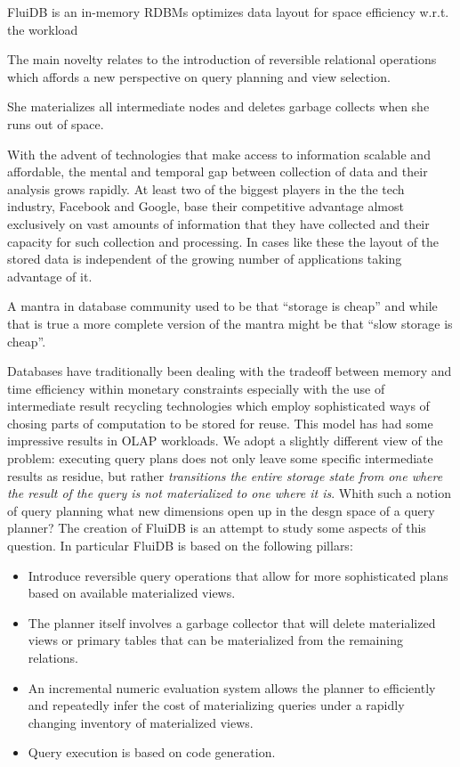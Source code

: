 
\begin{summary}
\item FluiDB is an in-memory RDBMs optimizes data layout for space
  efficiency w.r.t. the workload
\item The main novelty relates to the introduction of reversible
  relational operations which affords a new perspective on query
  planning and view selection.
\item She materializes all intermediate nodes and deletes garbage
  collects when she runs out of space.
\end{summary}

With the advent of technologies that make access to information
scalable and affordable, the mental and temporal gap between
collection of data and their analysis grows rapidly. At least two of
the biggest players in the the tech industry, Facebook and Google,
base their competitive advantage almost exclusively on vast amounts of
information that they have collected and their capacity for such
collection and processing. In cases like these the layout of the
stored data is independent of the growing number of applications
taking advantage of it.

A mantra in database community used to be that ``storage is cheap''
and while that is true a more complete version of the mantra might be
that ``slow storage is cheap''.

Databases have traditionally been dealing with the tradeoff between
memory and time efficiency within monetary constraints especially with
the use of intermediate result recycling technologies which employ
sophisticated ways of chosing parts of computation to be stored for
reuse. This model has had some impressive results in OLAP
workloads. We adopt a slightly different view of the problem:
executing query plans does not only leave some specific intermediate
results as residue, but rather \emph{transitions the entire storage
  state from one where the result of the query is not materialized to
  one where it is}. Whith such a notion of query planning what new
dimensions open up in the desgn space of a query planner? The creation
of FluiDB is an attempt to study some aspects of this question. In
particular FluiDB is based on the following pillars:

\begin{itemize}
\item Introduce reversible query operations that allow for more
  sophisticated plans based on available materialized views.
\item The planner itself involves a garbage collector that will delete
  materialized views or primary tables that can be materialized from
  the remaining relations.
\item An incremental numeric evaluation system allows the planner to
  efficiently and repeatedly infer the cost of materializing queries
  under a rapidly changing inventory of materialized views.
\item Query execution is based on code generation.
\end{itemize}

